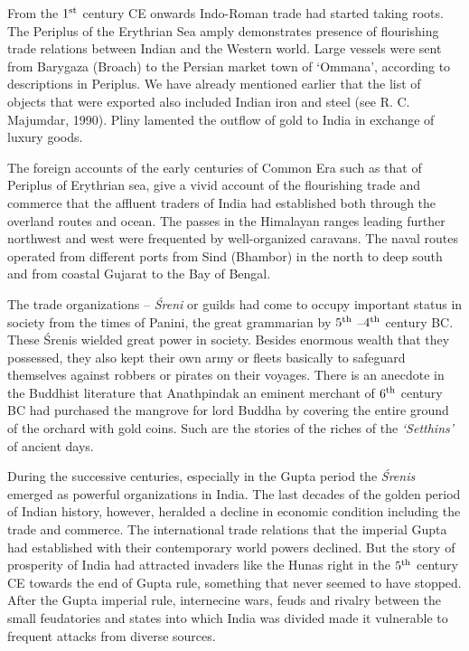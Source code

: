 From the $1^{\rm st}$ century CE onwards Indo-Roman trade had started taking roots. The Periplus of the Erythrian Sea amply demonstrates presence of flourishing trade relations between Indian and the Western world. Large vessels were sent from Barygaza (Broach) to the Persian market town of `Ommana', according to descriptions in Periplus. We have already mentioned earlier that the list of objects that were exported also included Indian iron and steel (see R. C. Majumdar, 1990). Pliny lamented the outflow of gold to India in exchange of luxury goods.

The foreign accounts of the early centuries of Common Era such as that of Periplus of Erythrian sea, give a vivid account of the flourishing trade and commerce that the affluent traders of India had established both through the overland routes and ocean. The passes in the Himalayan ranges leading further northwest and west were frequented by well-organized caravans. The naval routes operated from different ports from Sind (Bhambor) in the north to deep south and from coastal Gujarat to the Bay of Bengal.

The trade organizations – {\it Śreni} or guilds had come to occupy important status in society from the times of Panini, the great grammarian by $5^{\rm th}$ –$4^{\rm th}$ century BC. These Śrenis wielded great power in society. Besides enormous wealth that they possessed, they also kept their own army or fleets basically to safeguard themselves against robbers or pirates on their voyages. There is an anecdote in the Buddhist literature that Anathpindak an eminent merchant of $6^{\rm th}$ century BC had purchased the mangrove for lord Buddha by covering the entire ground of the orchard with gold coins. Such are the stories of the riches of the {\it `Setthins'} of ancient days.

During the successive centuries, especially in the Gupta period the {\it Śrenis} emerged as powerful organizations in India. The last decades of the golden period of Indian history, however, heralded a decline in economic condition including the trade and commerce. The international trade relations that the imperial Gupta had established with their contemporary world powers declined. But the story of prosperity of India had attracted invaders like the Hunas right in the $5^{\rm th}$ century CE towards the end of Gupta rule, something that never seemed to have stopped. After the Gupta imperial rule, internecine wars, feuds and rivalry between the small feudatories and states into which India was divided made it vulnerable to frequent attacks from diverse sources. 

